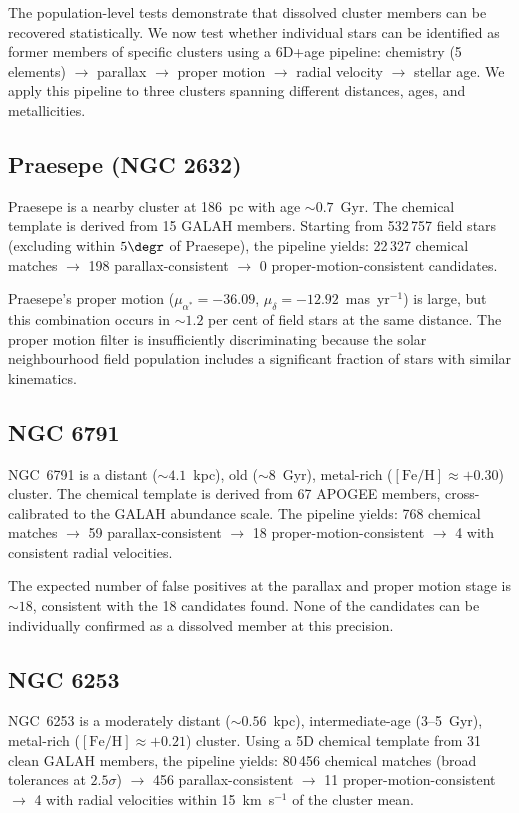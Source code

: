 \documentclass[fleqn,usenatbib]{mnras}
\newcommand{\kms}{km~s$^{-1}$\xspace}
\begin{document}
The population-level tests demonstrate that dissolved cluster members can be recovered statistically.
We now test whether individual stars can be identified as former members of specific clusters using a 6D+age pipeline: chemistry (5 elements) $\to$ parallax $\to$ proper motion $\to$ radial velocity $\to$ stellar age.
We apply this pipeline to three clusters spanning different distances, ages, and metallicities.

\subsection{Praesepe (NGC 2632)}

Praesepe is a nearby cluster at 186~pc with age ${\sim}0.7$~Gyr.
The chemical template is derived from 15 GALAH members.
Starting from 532\,757 field stars (excluding within $5\degr$ of Praesepe), the pipeline yields: 22\,327 chemical matches $\to$ 198 parallax-consistent $\to$ 0 proper-motion-consistent candidates.

Praesepe's proper motion ($\mu_{\alpha^*} = -36.09$, $\mu_\delta = -12.92$~mas~yr$^{-1}$) is large, but this combination occurs in ${\sim}1.2$ per cent of field stars at the same distance.
The proper motion filter is insufficiently discriminating because the solar neighbourhood field population includes a significant fraction of stars with similar kinematics.

\subsection{NGC 6791}

NGC~6791 is a distant (${\sim}4.1$~kpc), old (${\sim}8$~Gyr), metal-rich ($\mathrm{[Fe/H]} \approx +0.30$) cluster.
The chemical template is derived from 67 APOGEE members, cross-calibrated to the GALAH abundance scale.
The pipeline yields: 768 chemical matches $\to$ 59 parallax-consistent $\to$ 18 proper-motion-consistent $\to$ 4 with consistent radial velocities.

The expected number of false positives at the parallax and proper motion stage is ${\sim}18$, consistent with the 18 candidates found.
None of the candidates can be individually confirmed as a dissolved member at this precision.

\subsection{NGC 6253}

NGC~6253 is a moderately distant (${\sim}0.56$~kpc), intermediate-age (3--5~Gyr), metal-rich ($\mathrm{[Fe/H]} \approx +0.21$) cluster.
Using a 5D chemical template from 31 clean GALAH members, the pipeline yields: 80\,456 chemical matches (broad tolerances at $2.5\sigma$) $\to$ 456 parallax-consistent $\to$ 11 proper-motion-consistent $\to$ 4 with radial velocities within 15~\kms of the cluster mean.
\end{document}
